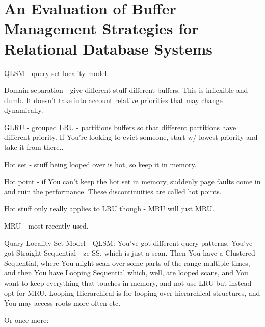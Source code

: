 \documentclass{article}
\begin{document}
		
			
			
			
			
			

	
				
				
				
				
				
				
				
				
				
				
                                                                                                                                   		
			
			
			
			
			
			
\newpage\phantom{asd}
\newpage
\section{An Evaluation of Buffer Management Strategies for
Relational Database Systems}

	QLSM - query set locality model.

	Domain separation - give different stuff different buffers. This is inflexible and dumb. It doesn't take into account relative priorities that may change dynamically.
	
	GLRU - grouped LRU - partitions buffers so that different partitions have different priority. If You're looking to evict someone, start w/ lowest priority and take it from there..
	
	Hot set - stuff being looped over is hot, so keep it in memory.
	
	Hot point - if You can't keep the hot set in memory, suddenly page faults come in and ruin the performance. These discontinuities are called hot points.
	
	Hot stuff only really applies to LRU though - MRU will just MRU.
	
	MRU - most recently used.
	
	Quary Locality Set Model - QLSM: You've got different query patterns. You've got Straight Sequential - ze SS, which is just a scan. Then You have a Clustered Sequential, where You might scan over some parts of the range multiple times, and then You have Looping Sequential which, well, are looped scans, and You want to keep everything that touches in memory, and not use LRU but instead opt for MRU. Looping Hierarchical is for looping over hierarchical structures, and You may access roots more often etc.
	
	Or once more:
	
\end{document}
